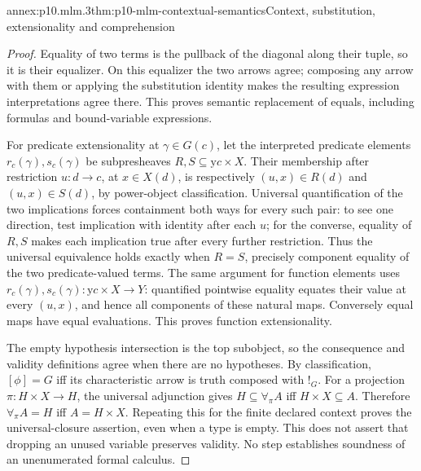 \begin{annexitem}{annex:p10.mlm.3}{thm:p10-mlm-contextual-semantics}{Context, substitution, extensionality and comprehension}
\begin{proof}
Equality of two terms is the pullback of the diagonal along their tuple,
so it is their equalizer. On this equalizer the two arrows agree; composing
any arrow with them or applying the substitution identity makes the
resulting expression interpretations agree there. This proves semantic
replacement of equals, including formulas and bound-variable expressions.

For predicate extensionality at \(\gamma\in G(c)\), let the interpreted
predicate elements \(r_c(\gamma),s_c(\gamma)\) be subpresheaves
\(R,S\subseteq\mathrm yc\times X\). Their membership after restriction
\(u:d\to c\), at \(x\in X(d)\), is respectively \((u,x)\in R(d)\)
and \((u,x)\in S(d)\), by power-object classification.
Universal quantification of the two implications forces containment both
ways for every such pair: to see one direction, test implication with
identity after each \(u\); for the converse, equality of \(R,S\) makes each
implication true after every further restriction. Thus the universal
equivalence holds exactly when \(R=S\), precisely component equality of
the two predicate-valued terms. The same argument for function elements
uses \(r_c(\gamma),s_c(\gamma):\mathrm yc\times X\to Y\): quantified
pointwise equality equates their value at every \((u,x)\), and hence all
components of these natural maps. Conversely equal maps have equal
evaluations. This proves function extensionality.

The empty hypothesis intersection is the top subobject, so the consequence
and validity definitions agree when there are no hypotheses.
By classification, \([\phi]=G\) iff its characteristic arrow is truth
composed with \(!_G\). For a projection \(\pi:H\times X\to H\), the universal
adjunction gives \(H\subseteq\forall_\pi A\) iff \(H\times X\subseteq A\).
Therefore \(\forall_\pi A=H\) iff \(A=H\times X\). Repeating this for
the finite declared context proves the universal-closure assertion, even
when a type is empty. This does not assert that dropping an unused variable
preserves validity. No step establishes soundness of an unenumerated
formal calculus.
\end{proof}
\end{annexitem}

